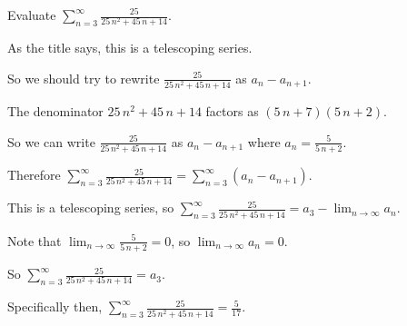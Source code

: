 \documentclass{ximera}
\begin{document}
\begin{question}
  Evaluate \(\displaystyle\sum_{n=3}^\infty \displaystyle\frac{25}{25 \, n^{2} + 45 \, n + 14}\).

  \begin{solution}
    \begin{hint}
      As the title says, this is a telescoping series.
    \end{hint}
    \begin{hint}
      So we should try to rewrite \(\displaystyle\frac{25}{25 \, n^{2} + 45 \, n + 14}\) as \(a_{n} - a_{n+1}\).
    \end{hint}
    \begin{hint}
      The denominator \(25 \, n^{2} + 45 \, n + 14\) factors as \({\left(5 \, n + 7\right)} {\left(5 \, n + 2\right)}\).
    \end{hint}
    \begin{hint}
      So we can write \(\displaystyle\frac{25}{25 \, n^{2} + 45 \, n + 14}\) as \(a_{n} - a_{n+1}\) where \(a_{n} = \displaystyle\frac{5}{5 \, n + 2}\).
    \end{hint}
    \begin{hint}
      Therefore \(\displaystyle\sum_{n=3}^\infty \displaystyle\frac{25}{25 \, n^{2} + 45 \, n + 14} = \displaystyle\sum_{n=3}^\infty \left( a_{n} - a_{n+1} \right)\).
    \end{hint}
    \begin{hint}
      This is a telescoping series, so \(\displaystyle\sum_{n=3}^\infty \displaystyle\frac{25}{25 \, n^{2} + 45 \, n + 14} = a_{3} - \lim_{n \to \infty} a_{n}\).
    \end{hint}
    \begin{hint}
      Note that \(\lim_{n \to \infty} \displaystyle\frac{5}{5 \, n + 2} = 0\), so \(\lim_{n \to \infty} a_{n} = 0\).
    \end{hint}
    \begin{hint}
      So \(\displaystyle\sum_{n=3}^\infty \displaystyle\frac{25}{25 \, n^{2} + 45 \, n + 14} = a_{3}\).
    \end{hint}
    \begin{hint}
      Specifically then, \(\displaystyle\sum_{n=3}^\infty \displaystyle\frac{25}{25 \, n^{2} + 45 \, n + 14} = \displaystyle\frac{5}{17}\).
    \end{hint}
    
    \begin{multiple-choice}
    \end{multiple-choice}
    
  \end{solution}
\end{question}
            
\end{document}
